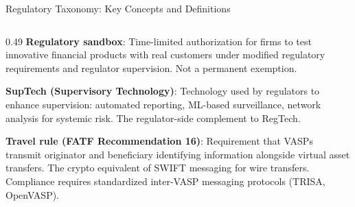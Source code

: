 \begin{frame}{Regulatory Taxonomy: Key Concepts and Definitions}
\begin{columns}[T]
\begin{column}{0.49\textwidth}
      \vspace{0.3em}
      \textbf{Regulatory sandbox}: Time-limited authorization for firms to test innovative financial products with real customers under modified regulatory requirements and regulator supervision. Not a permanent exemption.

      \vspace{0.3em}
      \textbf{SupTech (Supervisory Technology)}: Technology used by regulators to enhance supervision: automated reporting, ML-based surveillance, network analysis for systemic risk. The regulator-side complement to RegTech.

      \vspace{0.3em}
      \textbf{Travel rule (FATF Recommendation 16)}: Requirement that VASPs transmit originator and beneficiary identifying information alongside virtual asset transfers. The crypto equivalent of SWIFT messaging for wire transfers. Compliance requires standardized inter-VASP messaging protocols (TRISA, OpenVASP).
    \end{column}
  \end{columns}
\end{frame}


